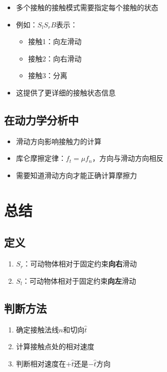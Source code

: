 \documentclass[12pt,a4paper]{article}
\begin{document}
\begin{itemize}
\item 多个接触的接触模式需要指定每个接触的状态
\item 例如：$S_lS_rB$表示：
  \begin{itemize}
  \item 接触1：向左滑动
  \item 接触2：向右滑动
  \item 接触3：分离
  \end{itemize}
\item 这提供了更详细的接触状态信息
\end{itemize}

\subsection{在动力学分析中}

\begin{itemize}
\item 滑动方向影响接触力的计算
\item 库仑摩擦定律：$f_t = \mu f_n$，方向与滑动方向相反
\item 需要知道滑动方向才能正确计算摩擦力
\end{itemize}

\section{总结}

\subsection{定义}

\begin{enumerate}
\item \textbf{$S_r$}：可动物体相对于固定约束\textbf{向右}滑动
\item \textbf{$S_l$}：可动物体相对于固定约束\textbf{向左}滑动
\end{enumerate}

\subsection{判断方法}

\begin{enumerate}
\item 确定接触法线$\hat{n}$和切向$\hat{t}$
\item 计算接触点处的相对速度
\item 判断相对速度在$+\hat{t}$还是$-\hat{t}$方向
\end{enumerate}
\end{document}
